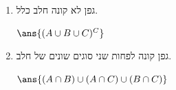 \begin{enumerate}
\begin{solbox}
\begin{center}
\end{center}
\end{solbox}
\item גפן לא קונה חלב כלל.
\begin{solbox}
$\ans{(A\cup B\cup C)^C}$

\begin{center}
\end{center}
\end{solbox}
\item גפן קונה לפחות שני סוגים שונים של חלב.
\begin{solbox}
$\ans{(A\cap B)\cup(A\cap C)\cup(B\cap C)}$

\begin{center}
\end{center}
\end{solbox}
\end{enumerate}
